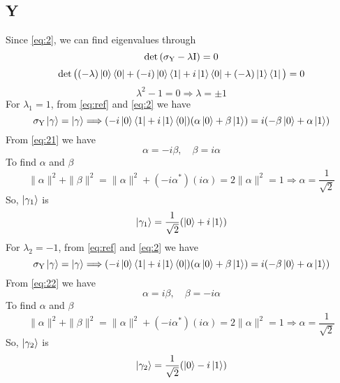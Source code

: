 \documentclass[12pt]{article}
\begin{document}
\subsection{Y}
Since \ref{eq:2}, we can find eigenvalues through
\begin{equation}
\det{(\sigma_{\textnormal{Y}} - \lambda\textnormal{I})} = 0
\end{equation}
\begin{equation*}
\det{\big((-\lambda)\ket{0}\bra{0} + (-i)\ket{0}\bra{1} + i\ket{1}\bra{0} + (-\lambda)\ket{1}\bra{1}\big)} = 0
\end{equation*}
\begin{equation*}
    \lambda^2 - 1 = 0 \Longrightarrow \lambda = \pm 1
\end{equation*}
For $\lambda_1 = 1$, from \ref{eq:ref} and \ref{eq:2} we have
\begin{equation}
    \label{eq:21}
    \sigma_{\textnormal{Y}}\ket{\gamma} = \ket{\gamma} \Longrightarrow (-i\ket{0}\bra{1} + i\ket{1}\bra{0})(\alpha\ket{0}+\beta\ket{1}) = i(-\beta\ket{0}+\alpha\ket{1}) 
\end{equation}
From \ref{eq:21} we have
\begin{equation}
    \alpha = -i\beta, \quad \beta = i\alpha
\end{equation}
To find $\alpha$ and $\beta$
\begin{equation}
    \|\alpha\|^2 + \|\beta\|^2 = \|\alpha\|^2 + (-i\alpha^{*})(i\alpha) = 2\|\alpha\|^2 = 1 \Longrightarrow \alpha = \frac{1}{\sqrt{2}}
\end{equation}
So, $\ket{\gamma_{1}}$ is
\begin{equation}
    \ket{\gamma_{1}} = \frac{1}{\sqrt{2}}(\ket{0} + i\ket{1})
\end{equation}
For $\lambda_2 = -1$, from \ref{eq:ref} and \ref{eq:2} we have
\begin{equation}
    \label{eq:22}
    \sigma_{\textnormal{Y}}\ket{\gamma} = \ket{\gamma} \Longrightarrow (-i\ket{0}\bra{1} + i\ket{1}\bra{0})(\alpha\ket{0}+\beta\ket{1}) = i(-\beta\ket{0}+\alpha\ket{1}) 
\end{equation}
From \ref{eq:22} we have
\begin{equation}
    \alpha = i\beta, \quad \beta = -i\alpha
\end{equation}
To find $\alpha$ and $\beta$
\begin{equation}
    \|\alpha\|^2 + \|\beta\|^2 = \|\alpha\|^2 + (-i\alpha^{*})(i\alpha) = 2\|\alpha\|^2 = 1 \Longrightarrow \alpha = \frac{1}{\sqrt{2}}
\end{equation}
So, $\ket{\gamma_{2}}$ is
\begin{equation}
    \ket{\gamma_{2}} = \frac{1}{\sqrt{2}}(\ket{0} - i\ket{1})
\end{equation}
\end{document}
